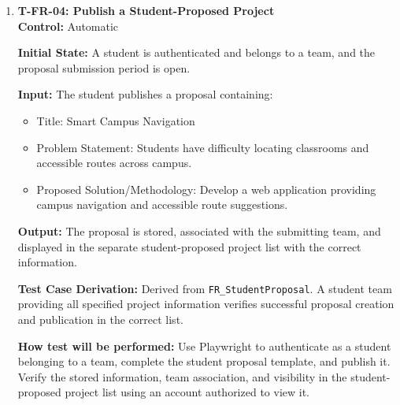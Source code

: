 \documentclass[12pt, titlepage]{article}
\begin{document}
\begin{enumerate}
\textbf{Input:} A completed proposal template similar to T-FR-01 with all of the following required fields: title, background, course, objectives, impact, supervisor capacity details, level of current completion, industry, and information regarding confidentiality and IP concern. All optional fields will be left empty. The supervisor will submit.
					
\textbf{Output:} The system accepts the submission and stores the proposal with the ``Proposal submitted'' status making it available for instructors to review.

\textbf{Test Case Derivation:} Derived from \texttt{FR\_ProposalOptionalFields} of the SRS. A proposal containing only mandatory fields represents the minimum valid submission and verifies that optional information is not incorrectly enforced as mandatory.

\textbf{How test will be performed:} Using Playwright, complete only the required proposal fields and submit. Verify that the proposal is accepted despite the missing optional information and is accessible to the instructor. The test passes if both conditions are satisfied.

\item \label{T-FR-04}\textbf{T-FR-04: Publish a Student-Proposed Project}\\

\textbf{Control:} Automatic

\textbf{Initial State:} A student is authenticated and belongs to a team, and
the proposal submission period is open.

\textbf{Input:} The student publishes a proposal containing:
\begin{itemize}
    \item Title: Smart Campus Navigation
    \item Problem Statement: Students have difficulty locating classrooms and
    accessible routes across campus.
    \item Proposed Solution/Methodology: Develop a web application providing
    campus navigation and accessible route suggestions.
\end{itemize}

\textbf{Output:} The proposal is stored, associated with the submitting team, and displayed in the separate student-proposed project list with the correct information.

\textbf{Test Case Derivation:} Derived from \texttt{FR\_StudentProposal}. A student team providing all specified project information verifies successful proposal creation and publication in the correct list.

\textbf{How test will be performed:} Use Playwright to authenticate as a student belonging to a team, complete the student proposal template, and publish it. Verify the stored information, team association, and visibility in the student-proposed project list using an account authorized to view it.

\end{enumerate}
\end{document}
